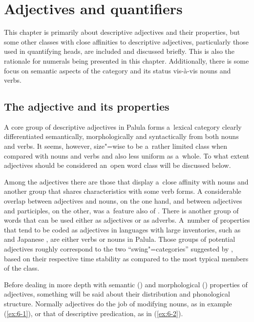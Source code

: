 \chapter{Adjectives and quantifiers}
\label{chap:6}

This chapter is primarily about descriptive adjectives and their properties, but some other classes with close affinities to descriptive adjectives, particularly those used in quantifying  heads, are included and discussed briefly. This is also the rationale for numerals being presented in this chapter. Additionally, there is some focus on semantic aspects of the  category and its status vis-à-vis nouns and verbs.


\section{The {adjective} and its properties}
\label{sec:6-1}


A core group of descriptive adjectives in Palula forms a~lexical category clearly differentiated semantically, morphologically and syntactically from both nouns and verbs. It seems, however, size"=wise to be a~rather limited class when compared with nouns and verbs and also less uniform as a~whole. To what extent adjectives should be considered an~open word class will be discussed below. 



Among the adjectives there are those that display a~close affinity with nouns and another group that shares characteristics with some verb forms. A considerable overlap between adjectives and nouns, on the one hand, and between adjectives and participles, on the other, was a~feature also of \iliOIA \citep[322, 967]{whitney1960}. There is another group of words that can be used either as adjectives or as adverbs. A~number of properties that tend to be coded as adjectives in languages with large inventories, such as \iliEnglish and Japanese \citep[60]{pustet2006}, are either verbs or nouns in Palula. Those groups of potential adjectives roughly correspond to the two ``swing"=categories'' suggested by \citet[321]{givon1979}, based on their respective time stability as compared to the most typical members of the class.



Before dealing in more depth with semantic () and morphological () properties of adjectives, something will be said about their distribution and phonological structure. Normally adjectives do the job of modifying nouns, as in example (\ref{ex:6-1}), or that of descriptive predication, as in (\ref{ex:6-2}).


